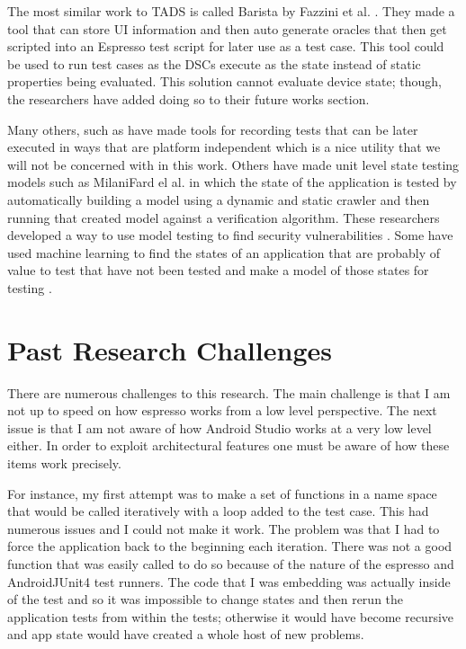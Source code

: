 The most similar work to TADS is called Barista by Fazzini et al. \cite{7927971}.  They made a tool that can store UI information and then auto generate oracles that then get scripted into an Espresso test script for later use as a test case.  This tool could be used to run test cases as the DSCs execute as the state instead of static properties being evaluated. This solution cannot evaluate device state; though, the researchers have added doing so to their future works section.   

Many others, such as \cite{7927971} have made tools for recording tests that can be later executed in ways that are platform independent which is a nice utility that we will not be concerned with in this work.  Others have made unit level state testing models such as MilaniFard el al. \cite{MilaniFard:2014:LET:2642937.2642991} in which the state of the application is tested by automatically building a model using a dynamic and static crawler and then running that created model against a verification algorithm.  These researchers developed a way to use model testing to find security vulnerabilities \cite{7911333}.  Some have used machine learning to find the states of an application that are probably of value to test that have not been tested and make a model of those states for testing \cite{Choi:2013:GGT:2544173.2509552}.


\section{Past Research Challenges}
There are numerous challenges to this research.  The main challenge is that I am not up to speed on how espresso works from a low level perspective.  The next issue is that I am not aware of how Android Studio works at a very low level either.  In order to exploit architectural features one must be aware of how these items work precisely.  

For instance, my first attempt was to make a set of functions in a name space that would be called iteratively with a loop added to the test case.  This had numerous issues and I could not make it work.  The problem was that I had to force the application back to the beginning each iteration.  There was not a good function that was easily called to do so because of the nature of the espresso and AndroidJUnit4 test runners.  The code that I was embedding was actually inside of the test and so it was impossible to change states and then rerun the application tests from within the tests; otherwise it would have become recursive and app state would have created a whole host of new problems.  

